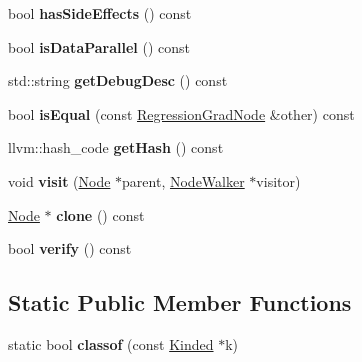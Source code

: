\begin{DoxyCompactItemize}
bool {\bfseries has\+Side\+Effects} () const
\item 
\mbox{\label{classglow_1_1_regression_grad_node_a2304b2127e4f6a5ad0458eae5f834372}} 
bool {\bfseries is\+Data\+Parallel} () const
\item 
\mbox{\label{classglow_1_1_regression_grad_node_a25eba448ff85a5c36583ff5adb2f79f7}} 
std\+::string {\bfseries get\+Debug\+Desc} () const
\item 
\mbox{\label{classglow_1_1_regression_grad_node_aceeb0b342da56337b5e5baa229d94ab0}} 
bool {\bfseries is\+Equal} (const \hyperlink{classglow_1_1_regression_grad_node}{Regression\+Grad\+Node} \&other) const
\item 
\mbox{\label{classglow_1_1_regression_grad_node_ab3d795f478b392705ee1544ede360bfc}} 
llvm\+::hash\+\_\+code {\bfseries get\+Hash} () const
\item 
\mbox{\label{classglow_1_1_regression_grad_node_a941f2d2453b1c1e84cbfed2b2acf6beb}} 
void {\bfseries visit} (\hyperlink{classglow_1_1_node}{Node} $\ast$parent, \hyperlink{classglow_1_1_node_walker}{Node\+Walker} $\ast$visitor)
\item 
\mbox{\label{classglow_1_1_regression_grad_node_a13aa8be6ec24ef16275a053edb045062}} 
\hyperlink{classglow_1_1_node}{Node} $\ast$ {\bfseries clone} () const
\item 
\mbox{\label{classglow_1_1_regression_grad_node_a2542cb53633736c70d7bc3c5facf4ddb}} 
bool {\bfseries verify} () const
\end{DoxyCompactItemize}
\subsection*{Static Public Member Functions}
\begin{DoxyCompactItemize}
\item 
\mbox{\label{classglow_1_1_regression_grad_node_a08fa8ec8bd20d1a32862a27d1e454f38}} 
static bool {\bfseries classof} (const \hyperlink{classglow_1_1_kinded}{Kinded} $\ast$k)
\end{DoxyCompactItemize}
